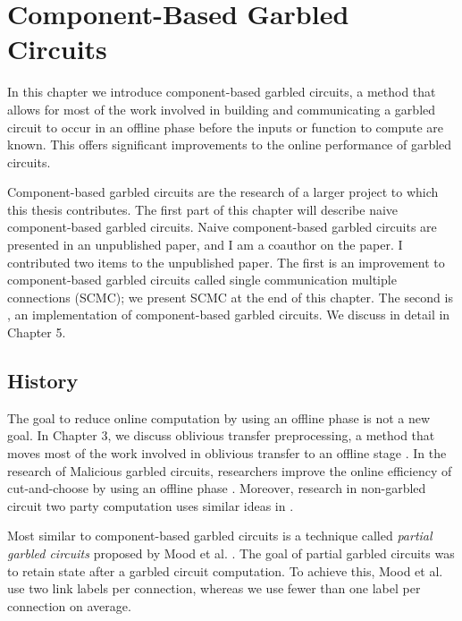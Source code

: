 
\chapter{Component-Based Garbled Circuits}

In this chapter we introduce component-based garbled circuits, a method that allows for most of the work involved in building and communicating a garbled circuit to occur in an offline phase before the inputs or function to compute are known. 
This offers significant improvements to the online performance of garbled circuits. 

Component-based garbled circuits are the research of a larger project to which this thesis contributes. 
The first part of this chapter will describe naive component-based garbled circuits. 
Naive component-based garbled circuits are presented in an unpublished paper, and I am a coauthor on the paper. 
I contributed two items to the unpublished paper.
The first is an improvement to component-based garbled circuits called single communication multiple connections (SCMC); we present SCMC at the end of this chapter. 
The second is \CompGC, an implementation of component-based garbled circuits. 
We discuss \CompGC in detail in Chapter 5. 

\section{History}
The goal to reduce online computation by using an offline phase is not a new goal.
In Chapter 3, we discuss oblivious transfer preprocessing, a method that moves most of the work involved in oblivious transfer to an offline stage \cite{Bea95}. 
In the research of Malicious garbled circuits, researchers improve the online efficiency of cut-and-choose by using an offline phase \cite{HKK14, LR14, blazing-fast}.
Moreover, research in non-garbled circuit two party computation uses similar ideas in \cite{DPSZ12, NNOB12}. 

Most similar to component-based garbled circuits is a technique called \textit{partial garbled circuits} proposed by Mood et al. \cite{MGBF14}. 
The goal of partial garbled circuits was to retain state after a garbled circuit computation. 
To achieve this, Mood et al. use two link labels per connection, whereas we use fewer than one label per connection on average.   

